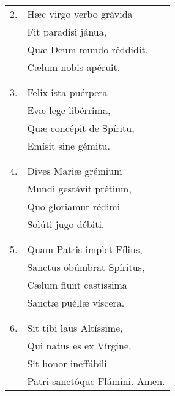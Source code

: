 \begin{longtable}{ll}
2. &Hæc virgo verbo grávida\\
&Fit paradísi jánua,\\
&Quæ Deum mundo réddidit,\\
&Cælum nobis apéruit.\\
\\\\
3. &Felix ista puérpera\\
&Evæ lege libérrima,\\
&Quæ concépit de Spíritu,\\
&Emísit sine gémitu.\\
\\\\
4. &Dives Mariæ grémium\\
&Mundi gestávit prétium,\\
&Quo gloriamur rédimi\\
&Solúti jugo débiti.\\
\\\\
5. &Quam Patris implet Fílius,\\
&Sanctus obúmbrat Spíritus,\\
&Cælum fiunt castíssima\\
&Sanctæ puéllæ víscera.\\
\\\\
6. &Sit tibi laus Altíssime,\\
&Qui natus es ex Vírgine,\\
&Sit honor ineffábili\\
&Patri sanctóque Flámini. Amen.
\end{longtable}
